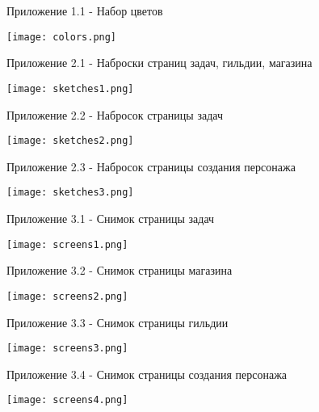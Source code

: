 \documentclass[../document.tex]{subfiles}
\begin{document}
\par Приложение 1.1 - Набор цветов

\texttt{[image: colors.png]}
\pagebreak
\par Приложение 2.1 - Наброски страниц задач, гильдии, магазина

\texttt{[image: sketches1.png]}

\par Приложение 2.2 - Набросок страницы задач

\texttt{[image: sketches2.png]}

\par Приложение 2.3 - Набросок страницы создания персонажа

\texttt{[image: sketches3.png]}
\pagebreak
\par Приложение 3.1 - Снимок страницы задач

\texttt{[image: screens1.png]}

\par Приложение 3.2 - Снимок страницы магазина

\texttt{[image: screens2.png]}

\par Приложение 3.3 - Снимок страницы гильдии

\texttt{[image: screens3.png]}

\par Приложение 3.4 - Снимок страницы создания персонажа

\texttt{[image: screens4.png]}
\end{document}
